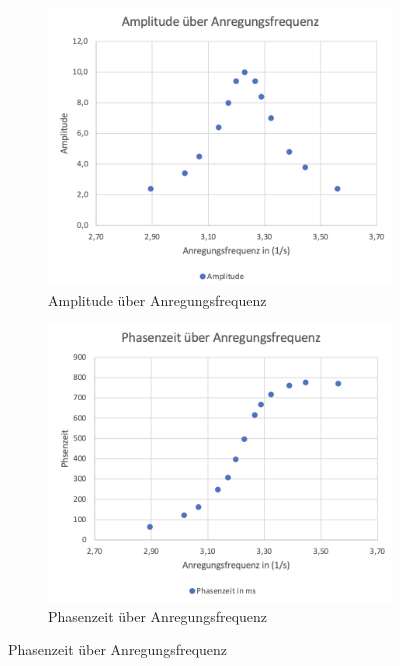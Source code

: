             \begin{figure}[H]
                \begin{subfigure}{0.48\textwidth}
                    \centering
                    \includegraphics[width=\textwidth]{bilder/plot_v3_1.png}
                    \caption{Amplitude über Anregungsfrequenz}
                    \label{fig:plot_v3_1}
                \end{subfigure}
                \begin{subfigure}{0.48\textwidth}
                    \centering
                    \includegraphics[width=\textwidth]{bilder/plot_v3_2.png}
                    \caption{Phasenzeit über Anregungsfrequenz}
                    \label{fig:plot_v3_2}
                \end{subfigure}
            \end{figure}
        
